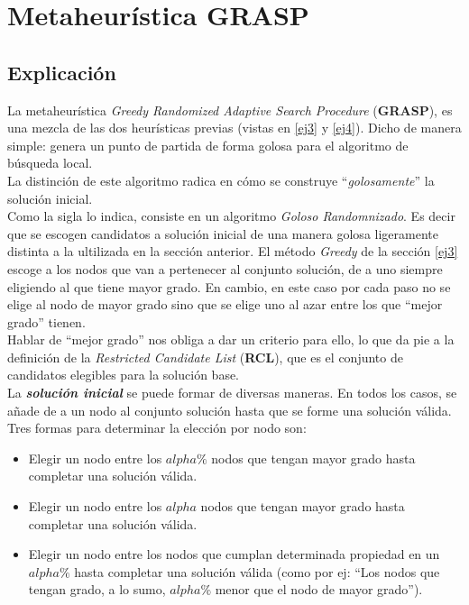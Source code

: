 \section{Metaheur\'istica GRASP}
\subsection{Explicaci\'on}


La metaheur\'istica \emph{Greedy Randomized Adaptive Search Procedure} (\textbf{GRASP}), es una mezcla de las dos heur\'isticas previas (vistas en \ref{ej3} y \ref{ej4}). Dicho de manera simple: genera un punto de partida de forma golosa para el algoritmo de b\'usqueda local.\\

La distinci\'on de este algoritmo radica en cómo se construye ``\textit{golosamente}'' la soluci\'on inicial.\\

Como la sigla lo indica, consiste en un algoritmo \textit{Goloso Randomnizado}. Es decir que se escogen candidatos a soluci\'on inicial de una manera golosa ligeramente distinta a la ultilizada en la sección anterior. El método \emph{Greedy} de la sección \ref{ej3} escoge a los nodos que van a pertenecer al conjunto solución, de a uno siempre eligiendo al que tiene mayor grado. En cambio, en este caso por cada paso no se elige al nodo de mayor grado sino que se elige uno al azar entre los que ``mejor grado'' tienen.\\ 

Hablar de ``mejor grado'' nos obliga a dar un criterio  para ello, lo que da pie a la definici\'on de la \emph{Restricted Candidate List} (\textbf{RCL}), que es el conjunto de candidatos elegibles para la soluci\'on base.\\

La \emph{\textbf{solución inicial}} se puede formar de diversas maneras. En todos los casos, se añade de a un nodo al conjunto solución hasta que se forme una solución válida. Tres formas para determinar la elección por nodo son: 

\begin{itemize}

\item Elegir un nodo entre los $alpha\%$ nodos que tengan mayor grado hasta completar una soluci\'on v\'alida.

\item Elegir un nodo entre los $alpha$ nodos que tengan mayor grado hasta completar una soluci\'on v\'alida.

\item Elegir un nodo entre los nodos que cumplan determinada propiedad en un $alpha\%$ hasta completar una soluci\'on v\'alida (como por ej: ``Los nodos que tengan grado, a lo sumo, $alpha\%$ menor que el nodo de mayor grado'').

\end{itemize}

